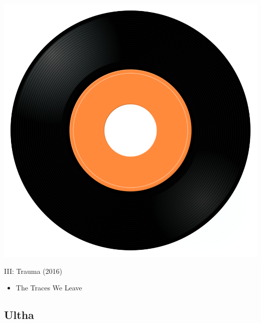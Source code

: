 \begin{minipage}[t]{0.25\textwidth}
\captionsetup{type=figure}
\includegraphics[width=\textwidth]{Images/cover.png}
\caption*{III: Trauma (2016)}
\end{minipage}
\begin{minipage}[t]{0.25\textwidth}\vspace{0pt}
\begin{itemize}[nosep,leftmargin=1em,labelwidth=*,align=left]
	\setlength{\itemsep}{0pt}
	\item The Traces We Leave
\end{itemize}
\end{minipage}

\subsection{Ultha}

